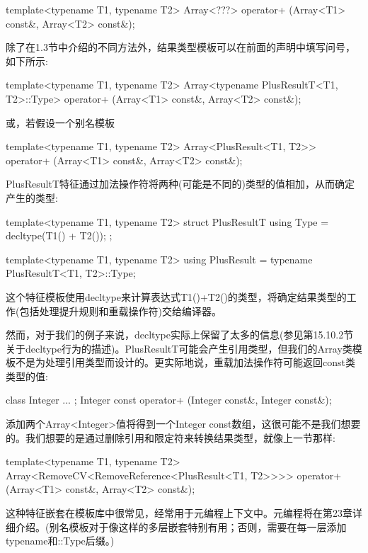 \begin{cpp}
template<typename T1, typename T2>
Array<???> operator+ (Array<T1> const&, Array<T2> const&);
\end{cpp}

除了在1.3节中介绍的不同方法外，结果类型模板可以在前面的声明中填写问号，如下所示:

\begin{cpp}
template<typename T1, typename T2>
Array<typename PlusResultT<T1, T2>::Type>
operator+ (Array<T1> const&, Array<T2> const&);
\end{cpp}

或，若假设一个别名模板

\begin{cpp}
template<typename T1, typename T2>
Array<PlusResult<T1, T2>>
operator+ (Array<T1> const&, Array<T2> const&);
\end{cpp}

PlusResultT特征通过加法操作符将两种(可能是不同的)类型的值相加，从而确定产生的类型:

\begin{cpp}
template<typename T1, typename T2>
struct PlusResultT {
	using Type = decltype(T1() + T2());
};

template<typename T1, typename T2>
using PlusResult = typename PlusResultT<T1, T2>::Type;
\end{cpp}

这个特征模板使用decltype来计算表达式T1()+T2()的类型，将确定结果类型的工作(包括处理提升规则和重载操作符)交给编译器。

然而，对于我们的例子来说，decltype实际上保留了太多的信息(参见第15.10.2节关于decltype行为的描述)。PlusResultT可能会产生引用类型，但我们的Array类模板不是为处理引用类型而设计的。更实际地说，重载加法操作符可能返回const类类型的值:

\begin{cpp}
class Integer { ... };
Integer const operator+ (Integer const&, Integer const&);
\end{cpp}

添加两个Array<Integer>值将得到一个Integer const数组，这很可能不是我们想要的。我们想要的是通过删除引用和限定符来转换结果类型，就像上一节那样:

\begin{cpp}
template<typename T1, typename T2>
Array<RemoveCV<RemoveReference<PlusResult<T1, T2>>>>
operator+ (Array<T1> const&, Array<T2> const&);
\end{cpp}

这种特征嵌套在模板库中很常见，经常用于元编程上下文中。元编程将在第23章详细介绍。(别名模板对于像这样的多层嵌套特别有用；否则，需要在每一层添加typename和::Type后缀。)

